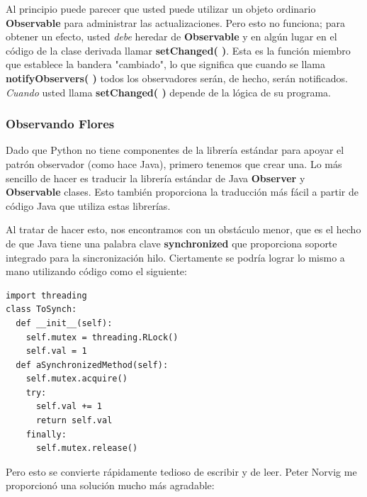\documentclass{article}
\begin{document}
Al principio puede parecer que usted puede utilizar un objeto ordinario \textbf{Observable} para administrar las actualizaciones. Pero esto no funciona; para obtener un efecto, usted \textit{debe} heredar de
\textbf{Observable} y en algún lugar en el código de la clase derivada llamar \textbf{setChanged( )}. Esta es la función miembro que establece la bandera "cambiado", lo que significa que cuando se llama \textbf{notifyObservers( )} todos los observadores serán, de hecho, serán notificados. \textit{Cuando} usted llama \textbf{setChanged( )} depende de la lógica de su programa.
 
\newpage
 
\subsubsection{Observando Flores}

Dado que Python  no tiene componentes de la  librería estándar para apoyar el patrón observador (como hace Java), primero tenemos que crear una. Lo más sencillo de hacer es traducir la librería estándar de Java \textbf{Observer} y \textbf{Observable} clases. Esto también proporciona la traducción más fácil a partir de código Java que utiliza estas librerías.    \newline

Al tratar de hacer esto, nos encontramos con un obstáculo menor, que es el hecho de que Java tiene una palabra clave \textbf{synchronized} que proporciona soporte integrado para la sincronización hilo. Ciertamente se podría lograr lo mismo a mano utilizando código como el siguiente:\newline

\begin{lstlisting} 
import threading  
class ToSynch: 
  def __init__(self): 
    self.mutex = threading.RLock() 
    self.val = 1 
  def aSynchronizedMethod(self): 
    self.mutex.acquire() 
    try: 
      self.val += 1 
      return self.val 
    finally: 
      self.mutex.release() 
\end{lstlisting}

 Pero esto se convierte rápidamente tedioso de escribir y de leer.  Peter Norvig me proporcionó una solución mucho más agradable:     \newline
 
\end{document}
